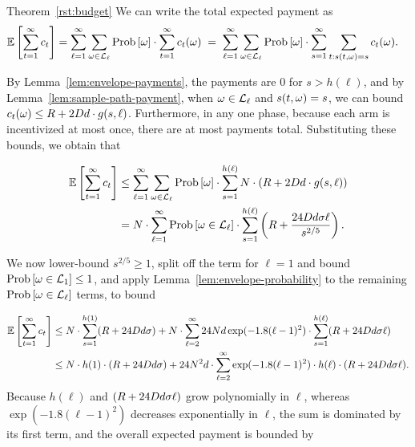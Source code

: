 \begin{extraproof}{Theorem~\ref{rst:budget}}
We can write the total expected payment as
\begin{align*}
  \Expect{\sum_{t=1}^{\infty} \PayA{t}}
& = \sum_{\ell = 1}^{\infty} \sum_{\SP \in \Env{\ell}}
  \Prob{\SP} \cdot \sum_{t=1}^{\infty} \PayA{t}(\SP)
\; = \; \sum_{\ell = 1}^{\infty} \sum_{\SP \in \Env{\ell}}
  \Prob{\SP} \cdot \sum_{s=1}^{\infty} \sum_{t: s(t,\SP) = s} \PayA{t}(\SP).
\end{align*}

By Lemma~\ref{lem:envelope-payments},
the payments are 0 for $s > h(\ell)$,
and by Lemma~\ref{lem:sample-path-payment},
when $\omega \in {\mathcal L}_{\ell}$ and $s(t,\omega) = s$, we can bound
$c_{t}(\omega) \leq R + 2 D d \cdot g(s,\ell)$.
Furthermore, in any one phase, because each arm is incentivized at
most once, there are at most \ARMNUM payments total.
Substituting these bounds, we obtain that

\begin{align*}
  \Expect{\sum_{t=1}^{\infty} \PayA{t}}
& \leq \sum_{\ell = 1}^{\infty} \sum_{\SP \in \Env{\ell}} \Prob{\SP} \cdot
  \sum_{s=1}^{h(\ell)} \ARMNUM \cdot (\MAXR + 2 \Diam d \cdot g(s,\ell))
\\ & = \ARMNUM \cdot
  \sum_{\ell = 1}^{\infty} \Prob{\SP \in \Env{\ell}} \cdot
  \sum_{s=1}^{h(\ell)} \left( \MAXR + \frac{24 \Diam d \sigma \ell}{s^{2/5}} \right).
\end{align*}

We now lower-bound $s^{2/5} \geq 1$, split off the term for $\ell=1$
and bound $\Prob{\SP \in \Env{1}} \leq 1$, and apply
Lemma~\ref{lem:envelope-probability} to the remaining
$\Prob{\SP \in \Env{\ell}}$ terms, to bound

\begin{align*}
\Expect{\sum_{t=1}^{\infty} \PayA{t}}
& \leq
\ARMNUM \cdot \sum_{s=1}^{h(1)} (\MAXR + 24 \Diam d \sigma)
+ \ARMNUM \cdot
  \sum_{\ell = 2}^{\infty} 24 \ARMNUM d\exp(-1.8(\ell-1)^2) \cdot
  \sum_{s=1}^{h(\ell)} (\MAXR + 24 \Diam d \sigma \ell)
\\ & \leq
\ARMNUM \cdot h(1) \cdot (\MAXR + 24 \Diam d \sigma)
+ 24 \ARMNUM^2 d \cdot \sum_{\ell = 2}^{\infty}
     \exp(-1.8(\ell-1)^2) \cdot h(\ell) \cdot (\MAXR + 24 \Diam d \sigma \ell).
\end{align*}
Because $h(\ell)$ and $(R + 24 D d \sigma \ell)$ grow
polynomially in $\ell$, whereas $\exp(-1.8(\ell-1)^2)$ decreases
exponentially in $\ell$, the sum is dominated by its first term, and
the overall expected payment is bounded by

\end{extraproof}

